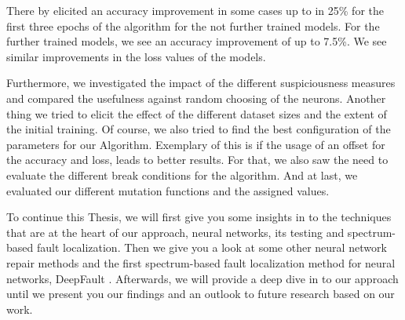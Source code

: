 There by elicited an accuracy improvement in some cases up to in 25\% for the first three epochs of the algorithm for the not further trained models.
For the further trained models, we see an accuracy improvement of up to 7.5\%.
We see similar improvements in the loss values of the models.

Furthermore, we investigated the impact of the different suspiciousness measures and compared the usefulness against random choosing of the neurons.
Another thing we tried to elicit the effect of the different dataset sizes and the extent of the initial training.
Of course, we also tried to find the best configuration of the parameters for our Algorithm.
Exemplary of this is if the usage of an offset for the accuracy and loss, leads to better results.
For that, we also saw the need to evaluate the different break conditions for the algorithm.
And at last, we evaluated our different mutation functions and the assigned values.

To continue this Thesis, we will first give you some insights in to the techniques that are at the heart of our approach, neural networks, its testing and spectrum-based fault localization.
Then we give you a look at some other neural network repair methods and the first spectrum-based fault localization method for neural networks, DeepFault  \cite{eniser_deepfault_2019}.
Afterwards, we will provide a deep dive in to our approach until we present you our findings and an outlook to future research based on our work.